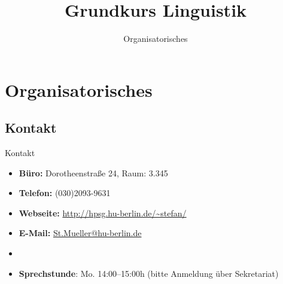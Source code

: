 
\title{Grundkurs Linguistik}

\subtitle{Organisatorisches}









	

\section{Organisatorisches}

\subsection{Kontakt}
%

\begin{frame}{Kontakt}

\begin{itemize}
	\item \textbf{Büro:} Dorotheenstraße 24, Raum: 3.345
	\item \textbf{Telefon:} (030)2093-9631
	\item \textbf{Webseite:} \url{http://hpsg.hu-berlin.de/~stefan/}
	\item \textbf{E-Mail:} \href{mailto:St.Mueller@hu-berlin.de}{St.Mueller@hu-berlin.de}
	\item[]
	\item \textbf{Sprechstunde}: Mo. 14:00--15:00h (bitte Anmeldung über Sekretariat)
\end{itemize}	

\end{frame}

